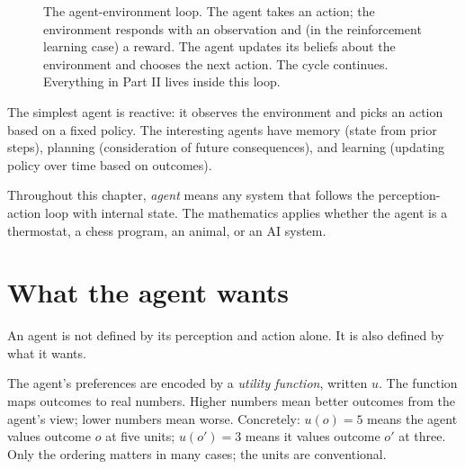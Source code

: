 \begin{figure}[h]
\centering
{}
\caption{The agent-environment loop. The agent takes an action; the environment responds with an observation and (in the reinforcement learning case) a reward. The agent updates its beliefs about the environment and chooses the next action. The cycle continues. Everything in Part II lives inside this loop.}
\label{fig:agent-loop}
\end{figure}

The simplest agent is reactive: it observes the environment and picks an action based on a fixed policy. The interesting agents have memory (state from prior steps), planning (consideration of future consequences), and learning (updating policy over time based on outcomes).

Throughout this chapter, \emph{agent} means any system that follows the perception-action loop with internal state. The mathematics applies whether the agent is a thermostat, a chess program, an animal, or an AI system.

\section*{What the agent wants}

An agent is not defined by its perception and action alone. It is also defined by what it wants.

The agent's preferences are encoded by a \emph{utility function}, written $u$. The function maps outcomes to real numbers. Higher numbers mean better outcomes from the agent's view; lower numbers mean worse. Concretely: $u(o) = 5$ means the agent values outcome $o$ at five units; $u(o') = 3$ means it values outcome $o'$ at three. Only the ordering matters in many cases; the units are conventional.

